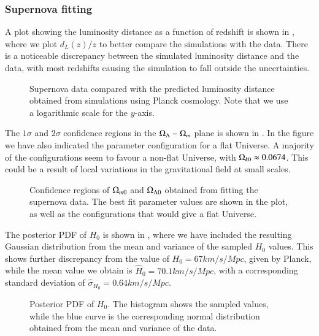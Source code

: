 \subsubsection{Supernova fitting}

A plot showing the luminosity distance as a function of redshift is shown in , where we plot $d_L(z)/z$ to better compare the simulations with the data. There is a noticeable discrepancy between the simulated luminosity distance and the data, with most redshifts causing the simulation to fall outside the uncertainties.       
\begin{figure}[ht!]
    \caption{Supernova data compared with the predicted luminosity distance obtained from simulations using Planck cosmology. Note that we use a logarithmic scale for the $y$-axis. }
    \label{fig:M1:results:dL_z_compare_planck}
\end{figure}

The $1\sigma$ and $2\sigma$ confidence regions in the $\Omega_{\Lambda}-\Omega_{m}$ plane is shown in . In the figure we have also indicated the parameter configuration for a flat Universe. A majority of the configurations seem to favour a non-flat Universe, with $\Omega_{k0}\approx 0.0674$. This could be a result of local variations in the gravitational field at small scales.      
\begin{figure}[ht!]
    \caption{Confidence regions of $\Omega_{m0}$ and $\Omega_{\Lambda 0}$ obtained from fitting the supernova data. The best fit parameter values are shown in the plot, as well as the configurations that would give a flat Universe.}
    \label{fig:M1:results:mcmc_supernova_fit_Nburn1000}
\end{figure}

The posterior PDF of $H_0$ is shown in , where we have included the resulting Gaussian distribution from the mean and variance of the sampled $H_0$ values. This shows further discrepancy from the value of $H_0=67\unit{km/s/Mpc}$, given by Planck, while the mean value we obtain is $\hat{H}_0=70.1\unit{km/s/Mpc}$, with a corresponding standard deviation of $\hat{\sigma}_{H_0}=0.64\unit{km/s/Mpc}$.       
\begin{figure}[ht!]
    \caption{Posterior PDF of $H_0$. The histogram shows the sampled values, while the blue curve is the corresponding normal distribution obtained from the mean and variance of the data.}
    \label{fig:M1:results:H0_pdf_Nburn1000}
\end{figure}


